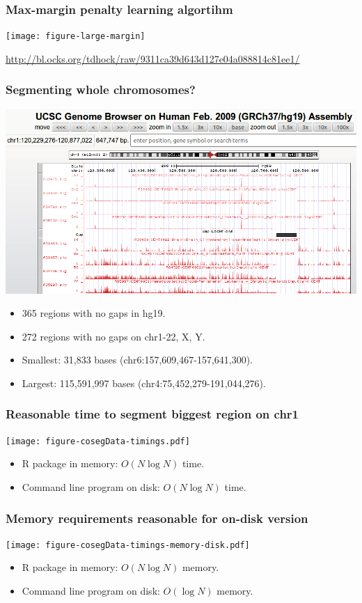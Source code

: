 \documentclass{beamer}
\begin{document}
\begin{frame}
  \frametitle{Max-margin penalty learning algortihm}
  \texttt{[image: figure-large-margin]}

\scriptsize \url{http://bl.ocks.org/tdhock/raw/9311ca39d643d127e04a088814c81ee1/}

\end{frame}

\begin{frame}
  \frametitle{Segmenting whole chromosomes?}
  \includegraphics[width=\textwidth]{screenshot-gap-peaks}
  \begin{itemize}
  \item 365 regions with no gaps in hg19.
  \item 272 regions with no gaps on chr1-22, X, Y.
  \item Smallest: 31,833 bases (chr6:157,609,467-157,641,300).
  \item Largest: 115,591,997 bases (chr4:75,452,279-191,044,276).
  \end{itemize}
\end{frame}


\begin{frame}
  \frametitle{Reasonable time to segment biggest region on chr1}
  \texttt{[image: figure-cosegData-timings.pdf]}
  \begin{itemize}
  \item R package in memory: $O(N \log N)$ time.
  \item Command line program on disk: $O(N \log N)$ time.
  \end{itemize}
\end{frame}

\begin{frame}
  \frametitle{Memory requirements reasonable for on-disk version}
  \texttt{[image: figure-cosegData-timings-memory-disk.pdf]}
  \begin{itemize}
  \item R package in memory: $O(N \log N)$ memory.
  \item Command line program on disk: $O(\log N)$ memory.
  \end{itemize}
\end{frame}
\end{document}

